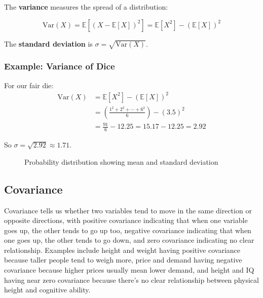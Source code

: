 The \textbf{variance} measures the spread of a distribution:

\begin{equation}
\text{Var}(X) = \mathbb{E}[(X - \mathbb{E}[X])^2] = \mathbb{E}[X^2] - (\mathbb{E}[X])^2
\end{equation}

The \textbf{standard deviation} is $\sigma = \sqrt{\text{Var}(X)}$.

\subsubsection{Example: Variance of Dice}

For our fair die:
\begin{align}
\text{Var}(X) &= \mathbb{E}[X^2] - (\mathbb{E}[X])^2 \\
&= \left(\frac{1^2 + 2^2 + \cdots + 6^2}{6}\right) - (3.5)^2 \\
&= \frac{91}{6} - 12.25 = 15.17 - 12.25 = 2.92
\end{align}

So $\sigma = \sqrt{2.92} \approx 1.71$.

\begin{figure}[h]
\centering
{}
\caption{Probability distribution showing mean and standard deviation}
\label{fig:dice-variance}
\end{figure}

\subsection{Covariance}

Covariance tells us whether two variables tend to move in the same direction or opposite directions, with positive covariance indicating that when one variable goes up, the other tends to go up too, negative covariance indicating that when one goes up, the other tends to go down, and zero covariance indicating no clear relationship. Examples include height and weight having positive covariance because taller people tend to weigh more, price and demand having negative covariance because higher prices usually mean lower demand, and height and IQ having near zero covariance because there's no clear relationship between physical height and cognitive ability.

